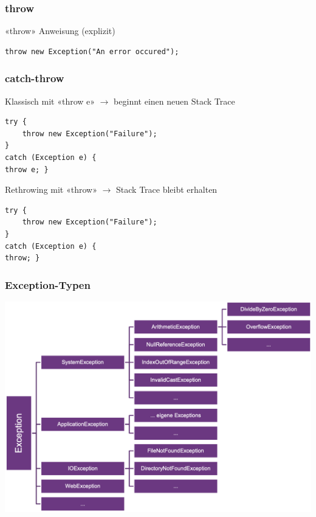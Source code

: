 \subsubsection{throw}
«throw» Anweisung (explizit)
\begin{lstlisting}
throw new Exception("An error occured");
\end{lstlisting}

\subsubsection{catch-throw}
Klassisch mit «throw e» $\rightarrow$ beginnt einen neuen Stack Trace
\begin{lstlisting}
try {
    throw new Exception("Failure");
}
catch (Exception e) {
throw e; }
\end{lstlisting}

Rethrowing mit «throw» $\rightarrow$ Stack Trace bleibt erhalten
\begin{lstlisting}
try {
    throw new Exception("Failure");
}
catch (Exception e) {
throw; }
\end{lstlisting}

\subsubsection{Exception-Typen}
\begin{center}
    \includegraphics[scale=.25]{graphic/exceptions/Exception-Typen.png}
\end{center}
\vspace{-8pt}

